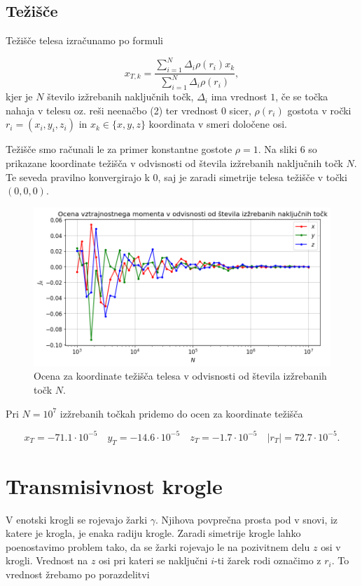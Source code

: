 \documentclass[slovene,11pt,a4paper]{article}
\begin{document}
\subsection{Težišče}

Težišče telesa izračunamo po formuli

\begin{equation}
x_{T,k} = \frac{\sum_{i=1}^N \Delta_i \rho(r_i) x_k}{\sum_{i=1}^N \Delta_i \rho(r_i)},
\end{equation}
kjer je $N$ število izžrebanih naključnih točk, $\Delta_i$ ima vrednost $1$, če se točka nahaja v telesu oz. reši neenačbo (2) ter vrednost $0$ sicer, $\rho(r_i)$ gostota v ročki $r_i = (x_i, y_i, z_i)$ in $x_k \in \{x,y,z\}$ koordinata v smeri določene osi.

Težišče smo računali le za primer konstantne gostote $\rho=1$. Na sliki 6 so prikazane koordinate težišča v odvisnosti od števila izžrebanih naključnih točk $N$. Te seveda pravilno konvergirajo k 0, saj je zaradi simetrije telesa težišče v točki $(0,0,0)$.

\begin{figure}[h!]
\centering
\includegraphics[width=13cm]{telo7.png}
\caption{Ocena za koordinate težišča telesa v odvisnosti od števila izžrebanih točk $N$.}
\end{figure}
\noindent Pri $N=10^7$ izžrebanih točkah pridemo do ocen za koordinate težišča

\[
x_T = -71.1 \cdot 10^{-5} \quad
y_T = -14.6 \cdot 10^{-5} \quad
z_T = -1.7 \cdot 10^{-5} \quad
|r_T| = 72.7 \cdot 10^{-5}.
\]


\section{Transmisivnost krogle}

V enotski krogli se rojevajo žarki $\gamma$. Njihova povprečna prosta pod v snovi, iz katere je krogla, je enaka radiju krogle. Zaradi simetrije krogle lahko poenostavimo problem tako, da se žarki rojevajo le na pozivitnem delu $z$ osi v krogli. Vrednost na $z$ osi pri kateri se naključni $i$-ti žarek rodi označimo z $r_i$. To vrednost žrebamo po porazdelitvi
\end{document}

